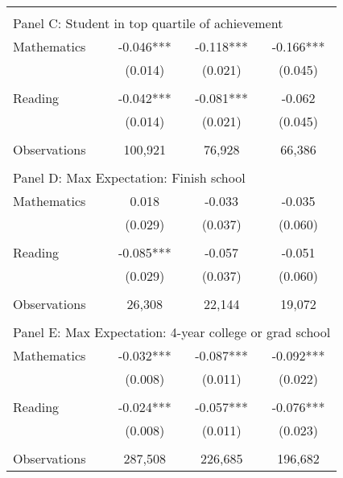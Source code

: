{\begin{tabular}{lccc}
&  &  &   \\
\multicolumn{4}{l}{Panel C: Student in top quartile of achievement} \\
\hspace{3mm}Mathematics&      -0.046***&      -0.118***&      -0.166***\\
                    &     (0.014)   &     (0.021)   &     (0.045)   \\
 
&  &  &   \\
\hspace{3mm}Reading &      -0.042***&      -0.081***&      -0.062   \\
                    &     (0.014)   &     (0.021)   &     (0.045)   \\
                    &               &               &               \\
\hspace{3mm}Observations&     100,921   &      76,928   &      66,386   \\
 
&  &  &   \\
\multicolumn{4}{l}{Panel D: Max Expectation: Finish school} \\
\hspace{3mm}Mathematics&       0.018   &      -0.033   &      -0.035   \\
                    &     (0.029)   &     (0.037)   &     (0.060)   \\
 
&  &  &   \\
\hspace{3mm}Reading &      -0.085***&      -0.057   &      -0.051   \\
                    &     (0.029)   &     (0.037)   &     (0.060)   \\
                    &               &               &               \\
\hspace{3mm}Observations&      26,308   &      22,144   &      19,072   \\
 
&  &  &   \\
\multicolumn{4}{l}{Panel E: Max Expectation: 4-year college or grad school} \\
\hspace{3mm}Mathematics&      -0.032***&      -0.087***&      -0.092***\\
                    &     (0.008)   &     (0.011)   &     (0.022)   \\
 
&  &  &   \\
\hspace{3mm}Reading &      -0.024***&      -0.057***&      -0.076***\\
                    &     (0.008)   &     (0.011)   &     (0.023)   \\
                    &               &               &               \\
\hspace{3mm}Observations&     287,508   &     226,685   &     196,682   \\
 

\bottomrule
\end{tabular}
}
